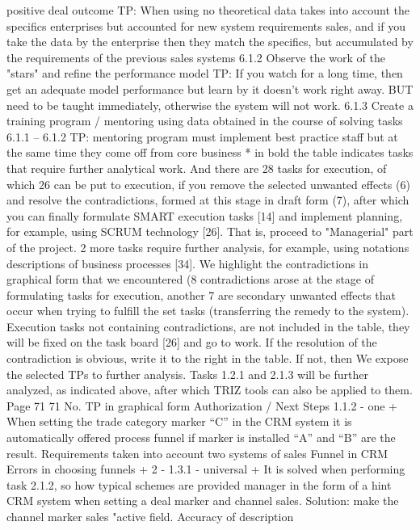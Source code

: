 positive deal outcome
TP: When using
no theoretical data
takes into account the specifics
enterprises but accounted for
new system requirements
sales, and if you take the data
by the enterprise then they
match the specifics, but
accumulated by
the requirements of the previous
sales systems
6.1.2
Observe the work of the "stars" and
refine the performance model
TP: If you watch for a long time, then
get an adequate model
performance but learn by
it doesn’t work right away. BUT
need to be taught immediately, otherwise
the system will not work.
6.1.3
Create a training program /
mentoring using data
obtained in the course of solving tasks 6.1.1 -- 6.1.2
TP: mentoring program
must implement
best practice staff
but at the same time they come off
from core business
* in bold the table indicates tasks that require further analytical
work.
And there are 28 tasks for execution, of which 26 can be put to execution,
if you remove the selected unwanted effects (6) and resolve the contradictions,
formed at this stage in draft form (7), after which you can
finally formulate SMART execution tasks [14] and implement
planning, for example, using SCRUM technology [26]. That is, proceed to
"Managerial" part of the project.
2 more tasks require further analysis, for example, using notations
descriptions of business processes [34].
We highlight the contradictions in graphical form that we encountered (8 contradictions
arose at the stage of formulating tasks for execution, another 7 are secondary
unwanted effects that occur when trying to fulfill the set
tasks (transferring the remedy to the system). Execution tasks not containing
contradictions, are not included in the table, they will be fixed on the task board [26] and go
to work.
If the resolution of the contradiction is obvious, write it to the right in the table. If not, then
We expose the selected TPs to further analysis.
Tasks 1.2.1 and 2.1.3 will be further analyzed, as indicated above,
after which TRIZ tools can also be applied to them.
Page 71
71
No.
TP in graphical form
Authorization / Next Steps
1.1.2
-
one
+
When setting the trade category marker “C”
in the CRM system it is automatically offered
process funnel if marker is installed
“A” and “B” are the result.
Requirements taken into account
two systems
of sales
Funnel in CRM
Errors in
choosing
funnels
+
2
-
1.3.1
-
universal
+
It is solved when performing task 2.1.2, so
how typical schemes are provided
manager in the form of a hint CRM system
when setting a deal marker and channel
sales. Solution: make the channel marker
sales "active field.
Accuracy of description
